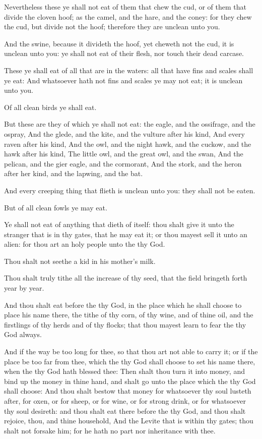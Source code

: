 \Verse Nevertheless these ye shall not eat of them that chew the cud, or of them that divide the cloven hoof; as the camel, and the hare, and the coney: for they chew the cud, but divide not the hoof; therefore they are unclean unto you.

\Verse And the swine, because it divideth the hoof, yet cheweth not the cud, it is unclean unto you: ye shall not eat of their flesh, nor touch their dead carcase.

\Verse These ye shall eat of all that are in the waters: all that have fins and scales shall ye eat: \Verse And whatsoever hath not fins and scales ye may not eat; it is unclean unto you.

\Verse Of all clean birds ye shall eat.

\Verse But these are they of which ye shall not eat: the eagle, and the ossifrage, and the ospray, \Verse And the glede, and the kite, and the vulture after his kind, \Verse And every raven after his kind, \Verse And the owl, and the night hawk, and the cuckow, and the hawk after his kind, \Verse The little owl, and the great owl, and the swan, \Verse And the pelican, and the gier eagle, and the cormorant, \Verse And the stork, and the heron after her kind, and the lapwing, and the bat.

\Verse And every creeping thing that flieth is unclean unto you: they shall not be eaten.

\Verse But of all clean fowls ye may eat.

\Verse Ye shall not eat of anything that dieth of itself: thou shalt give it unto the stranger that is in thy gates, that he may eat it; or thou mayest sell it unto an alien: for thou art an holy people unto the \LORD thy God.

Thou shalt not seethe a kid in his mother's milk.

\Verse Thou shalt truly tithe all the increase of thy seed, that the field bringeth forth year by year.

\Verse And thou shalt eat before the \LORD thy God, in the place which he shall choose to place his name there, the tithe of thy corn, of thy wine, and of thine oil, and the firstlings of thy herds and of thy flocks; that thou mayest learn to fear the \LORD thy God always.

\Verse And if the way be too long for thee, so that thou art not able to carry it; or if the place be too far from thee, which the \LORD thy God shall choose to set his name there, when the \LORD thy God hath blessed thee: \Verse Then shalt thou turn it into money, and bind up the money in thine hand, and shalt go unto the place which the \LORD thy God shall choose: \Verse And thou shalt bestow that money for whatsoever thy soul lusteth after, for oxen, or for sheep, or for wine, or for strong drink, or for whatsoever thy soul desireth: and thou shalt eat there before the \LORD thy God, and thou shalt rejoice, thou, and thine household, \Verse And the Levite that is within thy gates; thou shalt not forsake him; for he hath no part nor inheritance with thee.

